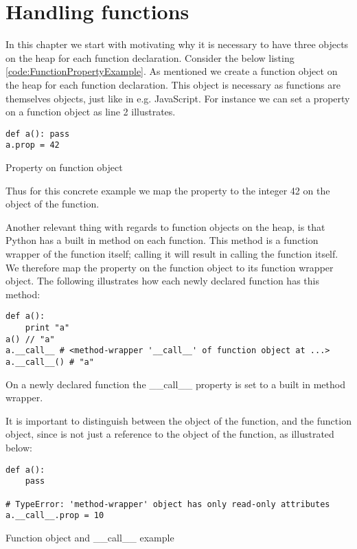 \chapter{Handling functions}
\label{Functions}
In this chapter we start with motivating why it is necessary to have three objects on the heap for each function declaration. Consider the below listing \ref{code:FunctionPropertyExample}. As mentioned we create a function object on the heap for each function declaration. This object is necessary as functions are themselves objects, just like in e.g. JavaScript. For instance we can set a property on a function object as line 2 illustrates.

\begin{listing}[H]
	\begin{verbatim}
def a(): pass
a.prop = 42
	\end{verbatim}
\caption{Property on function object}\label{code:FunctionPropertyExample}
\end{listing}

Thus for this concrete example we map the property  to the integer 42 on the object of the function.

Another relevant thing with regards to function objects on the heap, is that Python has a built in method  on each function. This method is a function wrapper of the function itself; calling it will result in calling the function itself. We therefore map the property  on the function object to its function wrapper object. The following illustrates how each newly declared function has this method:

\begin{listing}[H]
	\begin{verbatim}
def a():
	print "a"
a() // "a"
a.__call__ # <method-wrapper '__call__' of function object at ...> 
a.__call__() # "a"
	\end{verbatim}
\caption{On a newly declared function the \_\_call\_\_ property is set to a built in method wrapper.}\label{code:printFunctionExample}
\end{listing}

It is important to distinguish between the object of the function, and the function object, since  is not just a reference to the object of the function, as illustrated below:

\begin{listing}[H]
	\begin{verbatim}
def a(): 
	pass

# TypeError: 'method-wrapper' object has only read-only attributes
a.__call__.prop = 10
	\end{verbatim}
\caption{Function object and \_\_call\_\_ example}\label{code:callPropertyExample}
\end{listing}

